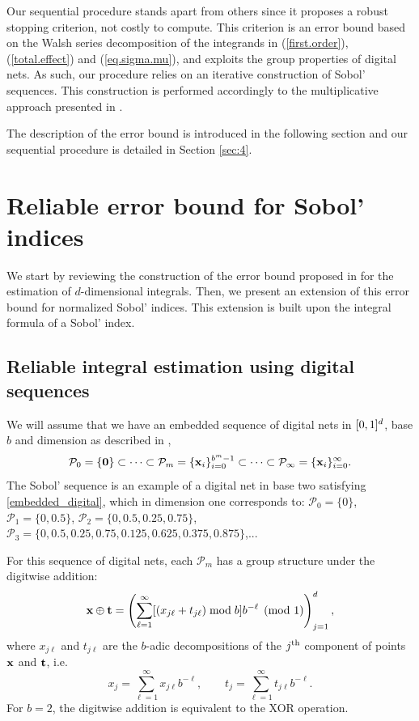 Our sequential procedure stands apart from others since it proposes a robust stopping criterion, not costly to compute. This criterion is an error bound based on the Walsh series decomposition of the integrands in (\ref{first.order}), (\ref{total.effect}) and (\ref{eq.sigma.mu}), and exploits the group properties of digital nets. As such, our procedure relies on an iterative construction of Sobol' sequences. This construction is performed accordingly to the multiplicative approach presented in \cite{GJAHMP}.

The description of the error bound is introduced in the following section and our sequential procedure is detailed in Section \ref{sec:4}.


\section{Reliable error bound for Sobol' indices}
\label{sec:3} 
We start by reviewing the construction of the error bound proposed in \cite{HicJim} for the estimation of $d$-dimensional integrals. Then, we present an extension of this error bound for normalized Sobol' indices. This extension is built upon the integral formula of a Sobol' index.

\subsection{Reliable integral estimation using digital sequences}
\label{sec:3.1}

We will assume that we have an embedded sequence of digital nets in $[0,1]^d$, base $b$ and dimension  as described in \cite[Sec. 2-3]{HicJim},
\begin{equation}\label{embedded_digital}
\mathcal{P}_0=\{\boldsymbol{\mathbf{0}}\}\subset\dots\subset\mathcal{P}_m=\{\boldsymbol{\mathbf{x}}_i\}_{i=0}^{b^m-1}\subset\dots\subset\mathcal{P}_\infty=\{\boldsymbol{\mathbf{x}}_i\}_{i=0}^{\infty}.
\end{equation}
The Sobol' sequence is an example of a digital net in base two satisfying \eqref{embedded_digital}, which in dimension one corresponds to: $\mathcal{P}_0=\{0\}$, $\mathcal{P}_1=\{0,0.5\}$, $\mathcal{P}_2=\{0,0.5,0.25,0.75\}$, $\mathcal{P}_3=\{0,0.5,0.25,0.75,0.125,0.625,0.375,0.875\}$,...

For this sequence of digital nets, each $\mathcal{P}_m$ has a group structure under the digitwise addition:
\[
\boldsymbol{\mathbf{x}} \oplus \boldsymbol{\mathbf{t}} = \left(\sum_{\ell=1}^{\infty} [(x_{j\ell} + t_{j\ell}) \bmod b] b^{-\ell} \pmod{1} \right)_{j=1}^d,
\]
where $x_{j\ell}$ and $t_{j\ell}$ are the $b$-adic decompositions of the $j^{\rm th}$ component of points $\boldsymbol{\mathbf{x}}$ and $\boldsymbol{\mathbf{t}}$, i.e.
\[
x_{j} = \sum_{\ell=1}^{\infty} x_{j\ell}b^{-\ell},\qquad t_{j} = \sum_{\ell=1}^{\infty} t_{j\ell}b^{-\ell}.
\]
For $b=2$, the digitwise addition is equivalent to the XOR operation.

